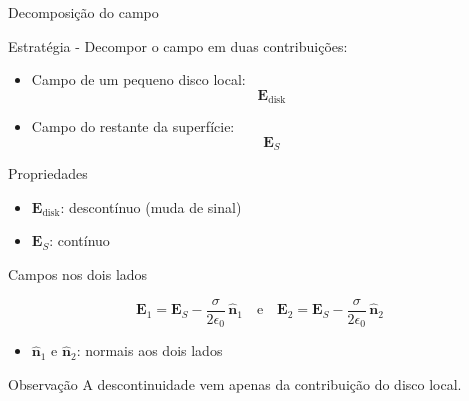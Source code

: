 \documentclass[aspectratio=169,11pt]{beamer}
\begin{document}
\begin{frame}{Decomposição do campo}

\begin{mybox}{Estratégia - }
Decompor o campo em duas contribuições:
\end{mybox}

\begin{itemize}
\item Campo de um pequeno disco local:
\[
\mathbf E_{\text{disk}}
\]
\item Campo do restante da superfície:
\[
\mathbf E_S
\]
\end{itemize}

\vspace{0.3cm}

\begin{alertblock}{Propriedades}
\begin{itemize}
\item \(\mathbf E_{\text{disk}}\): descontínuo (muda de sinal)
\item \(\mathbf E_S\): contínuo
\end{itemize}
\end{alertblock}

\end{frame}

\begin{frame}{Campos nos dois lados}

\begin{eqbox}
\begin{equation}
\mathbf E_1 = \mathbf E_S - \frac{\sigma}{2\epsilon_0}\,\hat{\mathbf n}_1
\quad \text{e} \quad
\mathbf E_2 = \mathbf E_S - \frac{\sigma}{2\epsilon_0}\,\hat{\mathbf n}_2
\tag{3.49}
\end{equation}
\end{eqbox}

\begin{itemize}
\item \(\hat{\mathbf n}_1\) e \(\hat{\mathbf n}_2\): normais aos dois lados
\end{itemize}

\vspace{0.3cm}

\begin{alertblock}{Observação}
A descontinuidade vem apenas da contribuição do disco local.
\end{alertblock}

\end{frame}
\end{document}

